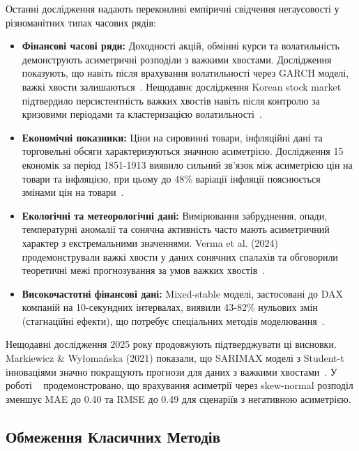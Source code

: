 \documentclass[12pt,a4paper]{article}
\begin{document}
Останні дослідження надають переконливі емпіричні свідчення негаусовості у різноманітних типах часових рядів:

\begin{itemize}
    \item \textbf{Фінансові часові ряди:} Доходності акцій, обмінні курси та волатильність демонструють асиметричні розподіли з важкими хвостами. Дослідження показують, що навіть після врахування волатильності через GARCH моделі, важкі хвости залишаються~\cite{viswanathan2003quantifying,kim2012approximation}. Нещодавнє дослідження Korean stock market підтвердило персистентність важких хвостів навіть після контролю за кризовими періодами та кластеризацією волатильності~\cite{kim2019fat}.

    \item \textbf{Економічні показники:} Ціни на сировинні товари, інфляційні дані та торговельні обсяги характеризуються значною асиметрією. Дослідження 15 економік за період 1851-1913 виявило сильний зв'язок між асиметрією цін на товари та інфляцією, при цьому до 48\% варіації інфляції пояснюється змінами цін на товари~\cite{jacks2024commodity}.

    \item \textbf{Екологічні та метеорологічні дані:} Вимірювання забруднення, опади, температурні аномалії та сонячна активність часто мають асиметричний характер з екстремальними значеннями. Verma et al. (2024) продемонстрували важкі хвости у даних сонячних спалахів та обговорили теоретичні межі прогнозування за умов важких хвостів~\cite{verma2024optimal}.

    \item \textbf{Високочастотні фінансові дані:} Mixed-stable моделі, застосовані до DAX компаній на 10-секундних інтервалах, виявили 43-82\% нульових змін (стагнаційні ефекти), що потребує спеціальних методів моделювання~\cite{slezak2023application,dedomenico2023modeling}.
\end{itemize}

Нещодавні дослідження 2025 року продовжують підтверджувати ці висновки. Markiewicz \& Wyłomańska (2021) показали, що SARIMAX моделі з Student-t інноваціями значно покращують прогнози для даних з важкими хвостами~\cite{markiewicz2021time}. У роботі ~\cite{saraiva2025modeling} продемонстровано, що врахування асиметрії через skew-normal розподіл зменшує MAE до 0.40 та RMSE до 0.49 для сценаріїв з негативною асиметрією.

\subsection{Обмеження Класичних Методів}
\label{subsec:limitations}
\end{document}
